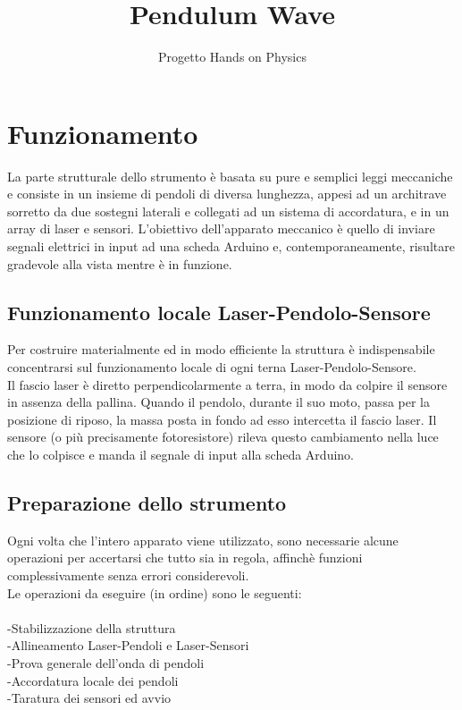 \documentclass[a4paper]{article}
\begin{document}
\title{Pendulum Wave}
\author{Progetto Hands on Physics}

\maketitle

\section{Funzionamento}

La parte strutturale dello strumento è basata su pure e semplici leggi meccaniche e consiste in un insieme di pendoli di diversa lunghezza, appesi ad un architrave sorretto da due sostegni laterali e collegati ad un sistema di accordatura, e in un array di laser e sensori. L'obiettivo dell'apparato meccanico è quello di inviare segnali elettrici in input ad una scheda Arduino e, contemporaneamente, risultare gradevole alla vista mentre è in funzione.

\subsection{Funzionamento locale Laser-Pendolo-Sensore}

Per costruire materialmente ed in modo efficiente la struttura è indispensabile concentrarsi sul funzionamento locale di ogni terna Laser-Pendolo-Sensore.\\
Il fascio laser è diretto perpendicolarmente a terra, in modo da colpire il sensore in assenza della pallina. Quando il pendolo, durante il suo moto, passa per la posizione di riposo, la massa posta in fondo ad esso intercetta il fascio laser. Il sensore (o più precisamente fotoresistore) rileva questo cambiamento nella luce che lo colpisce e manda il segnale di input alla scheda Arduino.

\subsection{Preparazione dello strumento}

Ogni volta che l'intero apparato viene utilizzato, sono necessarie alcune operazioni per accertarsi che tutto sia in regola, affinchè funzioni complessivamente senza errori considerevoli.\\
Le operazioni da eseguire (in ordine) sono le seguenti:\\\\
-Stabilizzazione della struttura\\
-Allineamento Laser-Pendoli e Laser-Sensori\\
-Prova generale dell'onda di pendoli\\
-Accordatura locale dei pendoli\\
-Taratura dei sensori ed avvio\\
\end{document}
